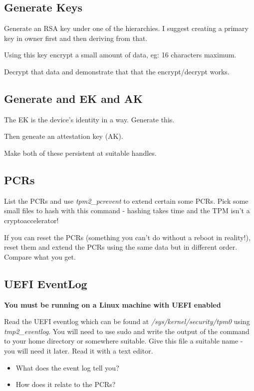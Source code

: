 \documentclass[11pt,a4paper]{article}
\begin{document}
\subsection{Generate Keys}
Generate an RSA key under one of the hierarchies. I suggest creating a primary key in owner first and then deriving from that.

Using this key encrypt a small amount of data, eg: 16 characters maximum.

Decrypt that data and demonstrate that that the encrypt/decrypt works.

\subsection{Generate and EK and AK}
The EK is the device's identity in a way. Generate this.

Then geneate an attestation key (AK).

Make both of these persistent at suitable handles.

\subsection{PCRs}\label{pcrs}
List the PCRs and use \textit{tpm2\_pcrevent} to extend certain some PCRs.  Pick some small files to hash with this command - hashing takes time and the TPM isn't a cryptoaccelerator!

If you can reset the PCRs (something you can't do without a reboot in reality!), reset them and extend the PCRs using the same data but in different order. Compare what you get.


\subsection{UEFI EventLog}
\textbf{You must be running on a Linux machine with UEFI enabled}

Read the UEFI eventlog which can be found at \textit{/sys/kernel/security/tpm0} using \textit{tmp2\_eventlog}. You will need to use sudo and write the output of the command to your home directory or somewhere suitable. Give this file a suitable name - you will need it later. Read it with a text editor.

\begin{itemize}
 \item What does the event log tell you?  
 \item How does it relate to the PCRs?
\end{itemize}
\end{document}
